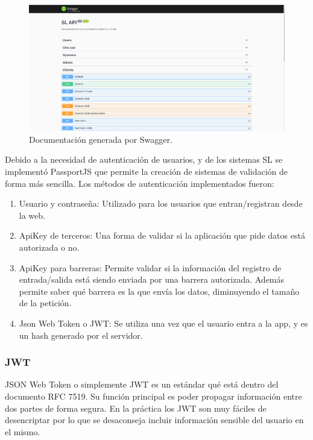 \begin{figure}
    \centering
    \includegraphics[width=\textwidth]{imgs/server/swagger.png}
    \caption{Documentación generada por Swagger.}
    \label{fig:swagger-example}
\end{figure}

Debido a la necesidad de autenticación de usuarios, y de los sistemas SL se implementó PassportJS que permite la creación de sistemas de validación de forma más sencilla. Los métodos de autenticación implementados fueron:

\begin{enumerate}
    \item Usuario y contraseña: Utilizado para los usuarios que entran/registran desde la web.
    \item ApiKey de terceros: Una forma de validar si la aplicación que pide datos está autorizada o no.
    \item ApiKey para barreras: Permite validar si la información del registro de entrada/salida está siendo enviada por una barrera autorizada. Además permite saber qué barrera es la que envía los datos, diminuyendo el tamaño de la petición.
    \item Json Web Token o JWT: Se utiliza una vez que el usuario entra a la app, y es un hash generado por el servidor.
\end{enumerate}

\subsubsection*{JWT}

JSON Web Token o simplemente JWT es un estándar qué está dentro del documento RFC 7519. Su función principal es poder propagar información entre dos partes de forma segura. En la práctica los JWT son muy fáciles de desencriptar por lo que se desaconseja incluir información sensible del usuario en el mismo.

